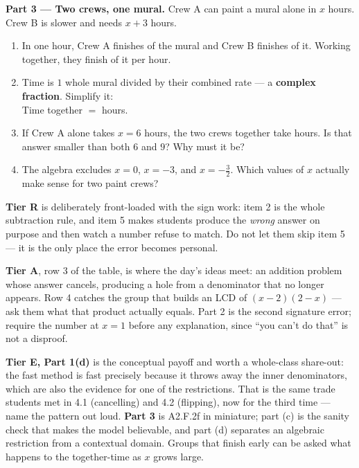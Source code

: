\documentclass[10pt]{article}
\begin{document}
\begin{tcolorbox}[colback=white, colframe=black!40, title=\textbf{Tier E --- Extension},
    fonttitle=\bfseries, arc=1.5mm, left=3mm, right=3mm, top=2mm, bottom=2mm, breakable]
\vspace{5pt}
\textbf{Part 3 --- Two crews, one mural.} Crew A can paint a mural alone in $x$ hours. Crew B is slower
and needs $x+3$ hours.
\begin{enumerate}[label=(\alph*), leftmargin=1.9em, itemsep=6pt]
  \item In one hour, Crew A finishes  of the mural and Crew B finishes  of
        it. Working together, they finish  of it per hour.
  \item Time is $1$ whole mural divided by their combined rate --- a \textbf{complex fraction}.
        Simplify it: \\[3pt]
        Time together $=$  hours.
  \item If Crew A alone takes $x=6$ hours, the two crews together take  hours. Is that
        answer smaller than both $6$ and $9$?  Why must it be? 
  \item The algebra excludes $x=0$, $x=-3$, and $x=-\tfrac32$. Which values of $x$ actually make sense
        for two paint crews? 
\end{enumerate}
\end{tcolorbox}

\begin{teachernote}
\textbf{Tier R} is deliberately front-loaded with the sign work: item 2 is the whole subtraction rule,
and item 5 makes students produce the \emph{wrong} answer on purpose and then watch a number refuse to
match. Do not let them skip item 5 --- it is the only place the error becomes personal.

\vspace{3pt}
\textbf{Tier A}, row 3 of the table, is where the day's ideas meet: an addition problem whose answer
cancels, producing a hole from a denominator that no longer appears. Row 4 catches the group that
builds an LCD of $(x-2)(2-x)$ --- ask them what that product actually equals. Part 2 is the second
signature error; require the number at $x=1$ before any explanation, since ``you can't do that'' is not
a disproof.

\vspace{3pt}
\textbf{Tier E, Part 1(d)} is the conceptual payoff and worth a whole-class share-out: the fast method
is fast precisely because it throws away the inner denominators, which are also the evidence for one of
the restrictions. That is the same trade students met in 4.1 (cancelling) and 4.2 (flipping), now for
the third time --- name the pattern out loud. \textbf{Part 3} is A2.F.2f in miniature; part (c) is the
sanity check that makes the model believable, and part (d) separates an algebraic restriction from a
contextual domain. Groups that finish early can be asked what happens to the together-time as $x$ grows
large.
\end{teachernote}
\end{document}
